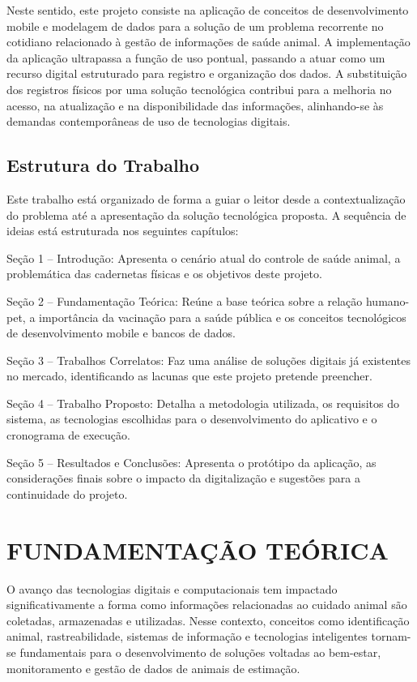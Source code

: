 \documentclass{UNESC}
\begin{document}
Neste sentido, este projeto consiste na aplicação de conceitos de desenvolvimento mobile e modelagem de dados para a solução de um problema recorrente no cotidiano relacionado à gestão de informações de saúde animal. A implementação da aplicação ultrapassa a função de uso pontual, passando a atuar como um recurso digital estruturado para registro e organização dos dados. A substituição dos registros físicos por uma solução tecnológica contribui para a melhoria no acesso, na atualização e na disponibilidade das informações, alinhando-se às demandas contemporâneas de uso de tecnologias digitais.


\subsection{Estrutura do Trabalho}
Este trabalho está organizado de forma a guiar o leitor desde a contextualização do problema até a apresentação da solução tecnológica proposta. A sequência de ideias está estruturada nos seguintes capítulos:

Seção 1 – Introdução: Apresenta o cenário atual do controle de saúde animal, a problemática das cadernetas físicas e os objetivos deste projeto.

Seção 2 – Fundamentação Teórica: Reúne a base teórica sobre a relação humano-pet, a importância da vacinação para a saúde pública e os conceitos tecnológicos de desenvolvimento mobile e bancos de dados.

Seção 3 – Trabalhos Correlatos: Faz uma análise de soluções digitais já existentes no mercado, identificando as lacunas que este projeto pretende preencher.

Seção 4 – Trabalho Proposto: Detalha a metodologia utilizada, os requisitos do sistema, as tecnologias escolhidas para o desenvolvimento do aplicativo e o cronograma de execução.

Seção 5 – Resultados e Conclusões: Apresenta o protótipo da aplicação, as considerações finais sobre o impacto da digitalização e sugestões para a continuidade do projeto.

\section{FUNDAMENTAÇÃO TEÓRICA}

O avanço das tecnologias digitais e computacionais tem impactado significativamente a forma como informações relacionadas ao cuidado animal são coletadas, armazenadas e utilizadas. Nesse contexto, conceitos como identificação animal, rastreabilidade, sistemas de informação e tecnologias inteligentes tornam-se fundamentais para o desenvolvimento de soluções voltadas ao bem-estar, monitoramento e gestão de dados de animais de estimação.
\end{document}

